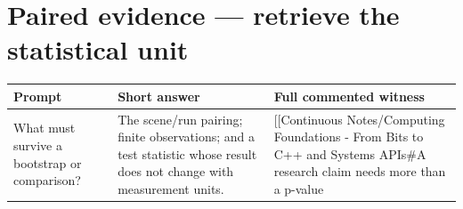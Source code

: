 \section{Paired evidence --- retrieve the statistical unit}\label{appendix-cb5af353ef77-paired-evidence-retrieve-the-statistical-unit}

{\def\LTcaptype{none} %
\begin{longtable}[]{@{}
  >{\raggedright\arraybackslash}p{}
  >{\raggedright\arraybackslash}p{}
  >{\raggedright\arraybackslash}p{}@{}}
\toprule\noalign{}
\begin{minipage}[b]{\linewidth}\raggedright
Prompt
\end{minipage} & \begin{minipage}[b]{\linewidth}\raggedright
Short answer
\end{minipage} & \begin{minipage}[b]{\linewidth}\raggedright
Full commented witness
\end{minipage} \\
\midrule\noalign{}
\endhead
\bottomrule\noalign{}
\endlastfoot
What must survive a bootstrap or comparison? & The scene/run pairing; finite observations; and a test statistic whose result does not change with measurement units. & {[}{[}Continuous Notes/Computing Foundations - From Bits to C++ and Systems APIs\#A research claim needs more than a p-value \\
\end{longtable}
}
